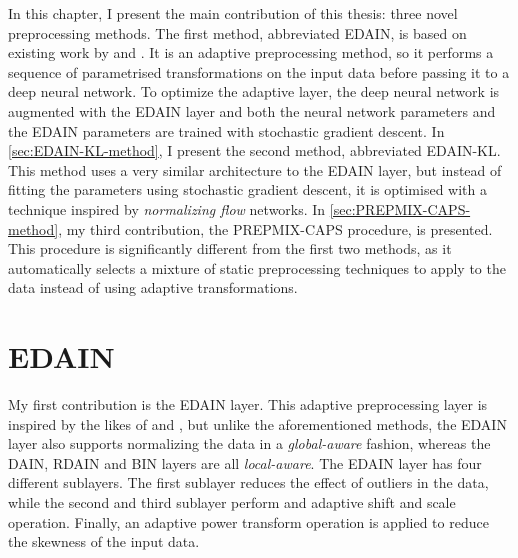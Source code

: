 \documentclass{statsmsc}
\begin{document}
{%
In this chapter, I present the main contribution of this thesis: three novel
preprocessing methods. The first method, abbreviated \acs{EDAIN}, is based on
existing work by \citeauthor{dain} and \citeauthor{bin}. It is an adaptive
preprocessing method, so it performs a sequence of parametrised transformations
on the input data before passing it to a deep neural network. To optimize the
adaptive layer, the deep neural network is augmented with the \acs{EDAIN} layer
and both the neural network parameters and the \acs{EDAIN} parameters are
trained with stochastic gradient descent.  In \cref{sec:EDAIN-KL-method}, I
present the second method, abbreviated \acs{EDAIN-KL}.  This method uses a very
similar architecture to the \acs{EDAIN} layer, but instead of fitting the
parameters using stochastic gradient descent, it is optimised with a technique
inspired by \textit{normalizing flow} networks. In
\cref{sec:PREPMIX-CAPS-method}, my third contribution, the \acs{PREPMIX-CAPS}
procedure, is presented. This procedure is significantly different from the
first two methods, as it automatically selects a mixture of static
preprocessing techniques to apply to the data instead of using adaptive
transformations.


\section{EDAIN}%
\label{sec:EDAIN-method}



My first contribution is the \ac{EDAIN} layer. This adaptive preprocessing layer is inspired
by the likes of \cite{dain}  and \cite{bin}, but unlike the aforementioned methods, the
\ac{EDAIN} layer also supports normalizing the data in a \textit{global-aware} fashion, whereas
the \ac{DAIN}, \ac{RDAIN} and \ac{BIN} layers are all \textit{local-aware}.
The \ac{EDAIN} layer has four different sublayers. The first sublayer reduces the effect of
outliers in the data, while the second and third sublayer perform and adaptive shift and
scale operation. Finally, an adaptive power transform operation is applied to reduce the
skewness of the input data.

}
\end{document}
